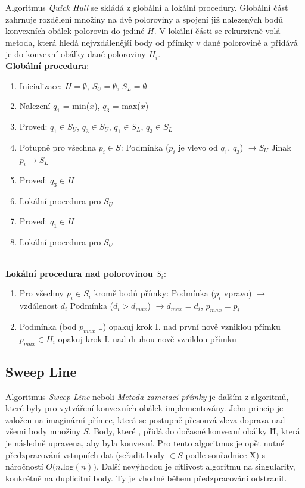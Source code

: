 \documentclass[a4paper, 12pt]{article}
\begin{document}
Algoritmus \textit{Quick Hull} se skládá z globální a lokální procedury. Globální část zahrnuje rozdělení množiny na dvě poloroviny a spojení již nalezených bodů konvexních obálek polorovin do jediné $H$. V lokální části se rekurzivně volá metoda, která hledá nejvzdálenější body od přímky v dané polorovině a přidává je do konvexní obálky dané poloroviny $H_i$.\\

\textbf{Globální procedura}:
\begin{enumerate}
\item Inicializace: $H = \emptyset$, $S_U = \emptyset$, $S_L = \emptyset$ 
\item Nalezení $q_1$ = min($x$), $q_3$ = max($x$)
\item Proveď: $q_1 \in S_U$, $q_3 \in S_U$, $q_1 \in S_L$, $q_3 \in S_L$
\item Potupně pro všechna $p_i \in S$:
\subitem Podmínka ($p_i$ je vlevo od $q_1$, $q_3$) $\rightarrow S_U$
\subitem Jinak $ p_i \rightarrow S_L$
\item Proveď: $q_3 \in H$
\item Lokální procedura pro $S_U$
\item Proveď: $q_1 \in H$
\item Lokální procedura pro $S_U$
\end{enumerate}
~\\
\textbf{Lokální procedura nad polorovinou $S_i$}:
\begin{enumerate}[label=\Roman*.]
\item Pro všechny $p_i \in S_i$ kromě bodů přímky:
\subitem Podmínka ($p_i$ vpravo) $\rightarrow$ vzdálenost $d_i$
\subsubitem Podmínka ($d_i > d_{max}$) $\rightarrow d_{max} = d_i$, $p_{max} = p_i$
\item Podmínka (bod $p_{max}$ $\exists$) 
\subitem opakuj krok I. nad první nově vzniklou přímku
\subitem $p_{max} \in H_i$
\subitem opakuj krok I. nad druhou nově vzniklou přímku
\end{enumerate}

\subsection{Sweep Line}
Algoritmus \textit{Sweep Line} neboli \textit{Metoda zametací přímky} je dalším z algoritmů, které byly pro vytváření konvexních obálek implementovány. Jeho princip je založen na imaginární přímce, která se postupně přesouvá zleva doprava nad všemi body množiny $S$. Body, které , přidá do dočasné konvexní obálky \={H}, která je následně upravena, aby byla konvexní. Pro tento algoritmus je opět nutné předzpracování vstupních dat (seřadit body $\in S$ podle souřadnice X) s náročností $O(n.$log$(n))$. Další nevýhodou je citlivost algoritmu na singularity, konkrétně na duplicitní body. Ty je vhodné během předzpracování odstranit.\\ 
\end{document}
